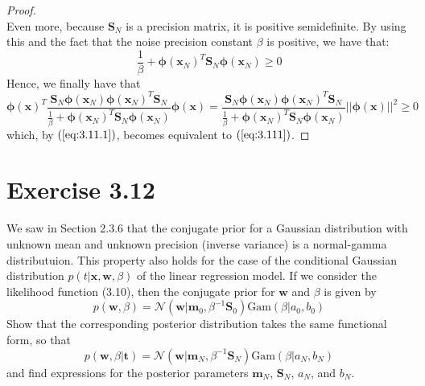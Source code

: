 \begin{proof}
\[    \] 
    Even more, because $\mathbf{S}_N$ is a precision matrix, it is 
    positive semidefinite. By using this and the fact that the noise
    precision constant $\beta$ is positive, we have that:
    \[
        \frac{1}{\beta} + \bm{\phi}(\mathbf{x}_N)^T\mathbf{S}_N\bm{\phi}(\mathbf{x}_N) \geq 0
    \] 
    Hence, we finally have that 
    \[
        \bm{\phi}(\mathbf{x})^T
        \frac{\mathbf{S}_N\bm{\phi}(\mathbf{x}_N)\bm{\phi}(\mathbf{x}_N)^T\mathbf{S}_N}
        {\frac{1}{\beta} + \bm{\phi}(\mathbf{x}_N)^T\mathbf{S}_N\bm{\phi}(\mathbf{x}_N)}
        \bm{\phi}(\mathbf{x}) 
        = \frac{\mathbf{S}_N\bm{\phi}(\mathbf{x}_N)\bm{\phi}(\mathbf{x}_N)^T\mathbf{S}_N}
          {\frac{1}{\beta} + \bm{\phi}(\mathbf{x}_N)^T\mathbf{S}_N\bm{\phi}(\mathbf{x}_N)}
          ||\bm{\phi}(\mathbf{x})||^2 \geq 0
    \] 
    which, by $(\ref{eq:3.11.1})$, becomes equivalent to $(\ref{eq:3.111})$.
\end{proof}

\section*{Exercise 3.12}
We saw in Section 2.3.6 that the conjugate prior for a Gaussian distribution
with unknown mean and unknown precision (inverse variance) is a normal-gamma
distributuion. This property also holds for the case of the conditional
Gaussian distribution $p(t | \mathbf{x}, \mathbf{w}, \beta)$ of the linear
regression model. If we consider the likelihood function (3.10), then
the conjugate prior for $\mathbf{w}$ and $\beta$ is given by
\begin{equation}\label{eq:3.112}\tag{3.112}
    p(\mathbf{w}, \beta) 
    = \mathcal{N}(\mathbf{w} | \mathbf{m}_0, \beta^{-1}\mathbf{S}_0) \text{Gam}(\beta | a_0, b_0)
\end{equation}
Show that the corresponding posterior distribution takes the same functional
form, so that 
\begin{equation}\label{eq:3.113}\tag{3.113}
    p(\mathbf{w}, \beta | \mathbf{t}) 
    = \mathcal{N}(\mathbf{w} | \mathbf{m}_N, \beta^{-1} \mathbf{S}_N) \text{Gam}(\beta | a_N, b_N)
\end{equation}
and find expressions for the posterior parameters $\mathbf{m}_N$, $\mathbf{S}_N$, $a_N$, 
and $b_N$.

\vspace{1em}

